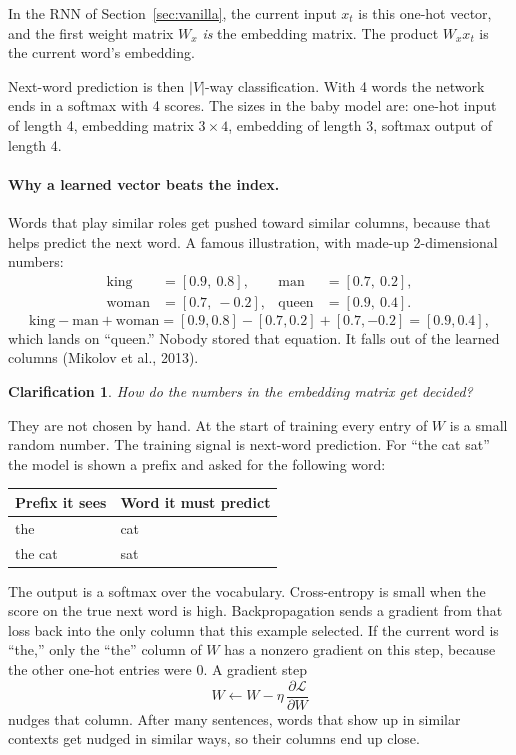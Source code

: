 \documentclass[11pt]{article}
\newtheorem*{clarification}{Clarification}
\begin{document}
In the RNN of Section~\ref{sec:vanilla}, the current input \(x_t\) is this
one-hot vector, and the first weight matrix \(W_x\) \emph{is} the embedding
matrix. The product \(W_x x_t\) is the current word's embedding.

Next-word prediction is then \(|V|\)-way classification. With 4 words the
network ends in a softmax with 4 scores. The sizes in the baby model are:
one-hot input of length 4, embedding matrix \(3\times 4\), embedding of
length 3, softmax output of length 4.

\paragraph{Why a learned vector beats the index.}
Words that play similar roles get pushed toward similar columns, because
that helps predict the next word. A famous illustration, with made-up
2-dimensional numbers:
\begin{align*}
\text{king}&=[0.9,\ 0.8], &
\text{man}&=[0.7,\ 0.2], \\
\text{woman}&=[0.7,\ -0.2], &
\text{queen}&=[0.9,\ 0.4].
\end{align*}
\[
\text{king}-\text{man}+\text{woman}
=
[0.9,0.8]-[0.7,0.2]+[0.7,-0.2]
=
[0.9,0.4],
\]
which lands on ``queen.'' Nobody stored that equation. It falls out of the
learned columns (Mikolov et al., 2013).

\begin{clarification}
How do the numbers in the embedding matrix get decided?
\end{clarification}

They are not chosen by hand. At the start of training every entry of \(W\)
is a small random number. The training signal is next-word prediction. For
``the cat sat'' the model is shown a prefix and asked for the following
word:

\begin{center}
\begin{tabular}{@{}ll@{}}
\toprule
Prefix it sees & Word it must predict \\
\midrule
the & cat \\
the cat & sat \\
\bottomrule
\end{tabular}
\end{center}

The output is a softmax over the vocabulary. Cross-entropy is small when
the score on the true next word is high. Backpropagation sends a gradient
from that loss back into the only column that this example selected. If the
current word is ``the,'' only the ``the'' column of \(W\) has a nonzero
gradient on this step, because the other one-hot entries were 0. A gradient
step
\[
W\leftarrow W-\eta\,\frac{\partial\mathcal{L}}{\partial W}
\]
nudges that column. After many sentences, words that show up in similar
contexts get nudged in similar ways, so their columns end up close.
\end{document}
